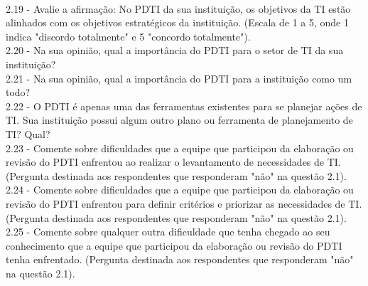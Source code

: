 \\2.19 - Avalie a afirmação: No PDTI da sua instituição, os objetivos da TI estão alinhados com os objetivos estratégicos da instituição. (Escala de 1 a 5, onde 1 indica "discordo totalmente" e 5 "concordo totalmente").
\\2.20 - Na sua opinião, qual a importância do PDTI para o setor de TI da sua instituição?
\\2.21 - Na sua opinião, qual a importância do PDTI para a instituição como um todo?
\\2.22 - O PDTI é apenas uma das ferramentas existentes para se planejar ações de TI. Sua instituição possui algum outro plano ou ferramenta de planejamento de TI? Qual?
\\2.23 - Comente sobre dificuldades que a equipe que participou da elaboração ou revisão do PDTI enfrentou ao realizar o levantamento de necessidades de TI. (Pergunta destinada aos respondentes que responderam "não" na questão 2.1).
\\2.24 - Comente sobre dificuldades que a equipe que participou da elaboração ou revisão do PDTI enfrentou para definir critérios e priorizar as necessidades de TI. (Pergunta destinada aos respondentes que responderam "não" na questão 2.1).
\\2.25 - Comente sobre qualquer outra dificuldade que tenha chegado ao seu conhecimento que a equipe que participou da elaboração ou revisão do PDTI tenha enfrentado. (Pergunta destinada aos respondentes que responderam "não" na questão 2.1).

